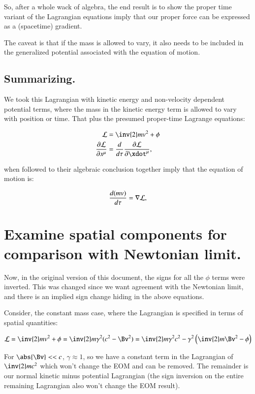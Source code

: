 So, after a whole wack of algebra, the end result is to show the proper time variant of the Lagrangian equations imply that our 
proper force can be expressed as a (spacetime) gradient.

The caveat is that if the mass is allowed to vary, it also needs to be
included in the generalized potential associated with the equation of motion.

\subsection{Summarizing. }

We took this Lagrangian with kinetic energy and non-velocity dependent potential terms, where the
mass in the kinetic energy term is allowed to vary with position or time.  That plus the
presumed proper-time Lagrange equations:

\begin{align}
\LL &= \inv{2} m v^2 + \phi \\
\PD{x^{\mu}}{\LL} &= \frac{d}{d\tau} \PD{\xdot^{\mu}}{\LL},
\end{align}

when followed to their algebraic conclusion together imply that the equation of motion is:

\begin{equation}\label{eqn:massvary:eom}
\frac{d (m v)}{d\tau} = \nabla \mathcal{L},
\end{equation}

\section{Examine spatial components for comparison with Newtonian limit. }

Now, in the original version of this document, the signs for all the $\phi$ terms were inverted.  This was changed since we want agreement with the Newtonian limit, and there is an implied sign change hiding in the above equations.

Consider, the constant mass case, where the Lagrangian is specified in terms of spatial quantities:

\begin{equation*}
\LL = \inv{2} m v^2 + \phi = \inv{2} m \gamma^2 ( c^2 - \Bv^2 ) = \inv{2} m \gamma^2 c^2 - \gamma^2\left( \inv{2} m \Bv^2 - \phi \right)
\end{equation*}

For $\abs{\Bv} << c$, $\gamma \approx 1$, so we have a constant term in the Lagrangian of $\inv{2} m c^2$ which won't change the
EOM and can be removed.  The remainder is our normal kinetic minus potential Lagrangian (the sign inversion on the entire remaining Lagrangian also won't change the EOM result).

